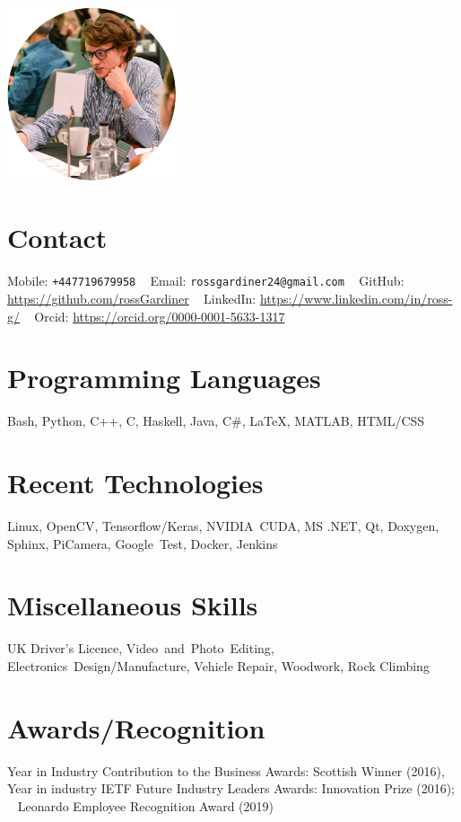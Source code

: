 \documentclass[]{cv-style}     %
\begin{document}
\lastupdated

\begin{aside}
\includegraphics[width=5cm]{p1000137-cropped.jpg}
\vspace{-0.3cm}
\section{Contact}
\vspace{0.1cm}Mobile: \texttt{+447719679958}
~
Email: \texttt{rossgardiner24@gmail.com}
~
GitHub: \url{https://github.com/rossGardiner}
~
LinkedIn: \url{https://www.linkedin.com/in/ross-g/}
~ 
Orcid: \url{https://orcid.org/0000-0001-5633-1317}
%

\section{Programming Languages}
Bash, Python, C++, C, Haskell, Java, C\#, \LaTeX, MATLAB, HTML/CSS
%
\section{Recent Technologies}
Linux, OpenCV, Tensorflow/Keras, NVIDIA~CUDA, MS .NET, Qt, Doxygen, Sphinx, PiCamera, Google~Test, Docker, Jenkins
\section{Miscellaneous Skills}
UK Driver's Licence, Video~and~Photo~Editing,
Electronics~Design/Manufacture, Vehicle Repair, Woodwork, Rock Climbing
\vspace{-0.2}
\section{Awards/Recognition}
Year in Industry Contribution to the Business Awards: Scottish Winner (2016),
~
Year in industry IETF Future Industry Leaders Awards: Innovation Prize (2016);
~
Leonardo Employee Recognition Award (2019)
\end{aside}
  \vspace{-0.3cm}
\end{document}
